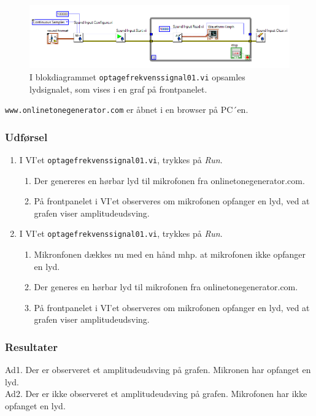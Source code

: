 			\begin{figure}[htb]
			\centering
				\includegraphics[width=5in]{of01.PNG}
				\caption{I blokdiagrammet \texttt{optagefrekvenssignal01.vi} opsamles lydsignalet, som vises i en graf på frontpanelet.}	
				\label{fig:bdoptage}
			\end{figure}	  
			
			\texttt{www.onlinetonegenerator.com} er åbnet i en browser på PC´en. 
	
		\subsubsection{Udførsel}
			\begin{enumerate}
				\item I VI'et \texttt{optagefrekvenssignal01.vi}, trykkes på \textit{Run}.  
				\begin{enumerate}
				\item Der genereres en hørbar lyd til mikrofonen fra onlinetonegenerator.com. 
				\item På frontpanelet i VI'et observeres om mikrofonen opfanger en lyd, ved at grafen viser amplitudeudsving.
				\end{enumerate}
				\item I VI'et \texttt{optagefrekvenssignal01.vi}, trykkes på \textit{Run}. 
				\begin{enumerate}
				\item Mikronfonen dækkes nu med en hånd mhp. at mikrofonen ikke opfanger en lyd. 
				\item Der generes en hørbar lyd til mikrofonen fra onlinetonegenerator.com. 
				\item På frontpanelet i VI'et observeres om mikrofonen opfanger en lyd, ved at grafen viser amplitudeudsving.
				\end{enumerate}
			\end{enumerate}
			
		\subsubsection{Resultater}
		Ad1. Der er observeret et amplitudeudsving på grafen. Mikronen har opfanget en lyd. \\
		Ad2. Der er ikke observeret et amplitudeudsving på grafen. Mikrofonen har ikke opfanget en lyd. 
		
